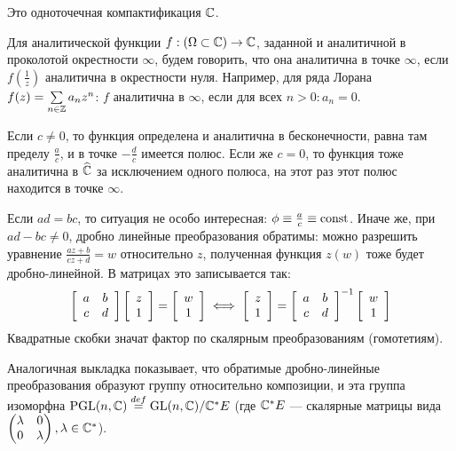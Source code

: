 \documentclass[a4paper]{report}
\begin{document}
    Это одноточечная компактификация $\C$.

    Для аналитической функции $f: (\Omega \subset \C) \map \C$, заданной и аналитичной в проколотой окрестности $\infty$, будем говорить, что она аналитична в точке $\infty$, если $f\left(\frac{1}{z}\right)$ аналитична в окрестности нуля.
    Например, для ряда Лорана $f(z) = \sum\limits_{n \in \Z}a_n z^n$: $f$ аналитична в $\infty$, если для всех $n > 0: a_n = 0$.

    Если $c \ne 0$, то функция определена и аналитична в бесконечности, равна там пределу $\frac{a}{c}$, и в точке $-\frac{d}{c}$ имеется полюс.
    Если же $c = 0$, то функция тоже аналитична в $\hat{\C}$ за исключением одного полюса, на этот раз этот полюс находится в точке $\infty$.

    Если $ad = bc$, то ситуация не особо интересная: $\phi \equiv \frac{a}{c} \equiv \const$.
    Иначе же, при $ad - bc \ne 0$, дробно линейные преобразования обратимы: можно разрешить уравнение $\frac{az + b}{cz + d} = w$ относительно $z$, полученная функция $z(w)$ тоже будет дробно-линейной.
    В матрицах это записывается так: \[\left[\arr{cc}{a & b \\ c & d}\right]\left[\arr{c}{z \\ 1}\right] = \left[\arr{c}{w \\ 1}\right] \iff \left[\arr{c}{z \\ 1}\right] = \left[\arr{cc}{a & b \\ c & d}\right]^{-1}\left[\arr{c}{w \\ 1}\right]\]
    Квадратные скобки значат фактор по скалярным преобразованиям (гомотетиям).

    Аналогичная выкладка показывает, что обратимые дробно-линейные преобразования образуют группу относительно композиции, и эта группа изоморфна $\PGL(n, \C) \bydef \GL(n, \C)/\C^*E$ (где $\C^* E$ --- скалярные матрицы вида $\vect{\lambda & 0 \\ 0 & \lambda}, \lambda \in \C^*$).
\end{document}
